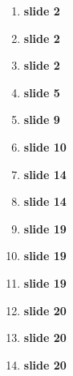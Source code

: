 \documentclass[11pt]{article}
\begin{document}
\begin{enumerate}
  \item \textbf{slide 2} \cite{suzukiAtelier,Kim2017,Nebeling:2016:WCW:2858036.2858169} 
  \item \textbf{slide 2} \cite{Chang:2016:ACC:2858036.2858411}
  \item \textbf{slide 2} \cite{turkopticon,dynamo,takingAHITMcInnis}
  \item \textbf{slide 5} \cite{bernsteinSoylent}
  \item \textbf{slide 9} \cite{crowdForgeKittur}
  \item \textbf{slide 10} 
  \item \textbf{slide 14} \cite{embracingErrorKrishna}
  \item \textbf{slide 14} \cite{taskSearch,delayAndOrderLasecki}
  \item \textbf{slide 19} \cite{whyWouldAnyoneBrewer}
  \item \textbf{slide 19} \cite{MaliciousCrowdworkersGadiraju}
  \item \textbf{slide 19} \cite{turkopticon}
  \item \textbf{slide 20} \cite{clark1908cotton}
  \item \textbf{slide 20} \cite{roy1954efficiency}
  \item \textbf{slide 20} \cite{hart2016rise}
\end{enumerate}


\printbibliography{}
\end{document}
